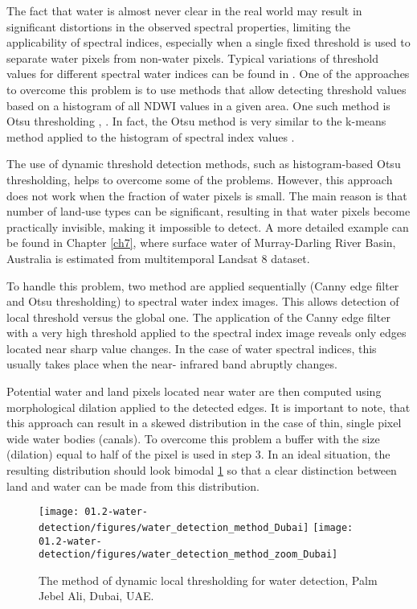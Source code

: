 The fact that water is almost never clear in the real world may result in significant distortions in the observed spectral properties, limiting the applicability of spectral indices, especially when a single fixed threshold is used to separate water pixels from non-water pixels. Typical variations of threshold values for different spectral water indices can be found in \citep{Ji2009}. One of the approaches to overcome this problem is to use methods that allow detecting threshold values based on a histogram of all NDWI values in a given area. One such method is Otsu thresholding \citep{Li2013}, \citep{Yang2014}. In fact, the Otsu method is very similar to the k-means method applied to the histogram of spectral index values \citep{Liu2009}.

The use of dynamic threshold detection methods, such as histogram-based Otsu thresholding, helps to overcome some of the problems. However, this approach does not work when the fraction of water pixels is small. The main reason is that number of land-use types can be significant, resulting in that water pixels become practically invisible, making it impossible to detect. A more detailed example can be found in Chapter \ref{ch7}, where surface water of Murray-Darling River Basin, Australia is estimated from multitemporal Landsat 8 dataset.

To handle this problem, two method are applied sequentially (Canny edge filter and Otsu thresholding) to spectral water index images. This allows detection of local threshold versus the global one. The application of the Canny edge filter with a very high threshold applied to the spectral index image reveals only edges located near sharp value changes. In the case of water spectral indices, this usually takes place when the near- infrared band abruptly changes.

Potential water and land pixels located near water are then computed using morphological dilation applied to the detected edges. It is important to note, that this approach can result in a skewed distribution in the case of thin, single pixel wide water bodies (canals). To overcome this problem a buffer with the size (dilation) equal to half of the pixel is used in step 3. In an ideal situation, the resulting distribution should look bimodal \ref{fig:water_detection_method} so that a clear distinction between land and water can be made from this distribution.

\begin{figure}
	\centering
	\texttt{[image: 01.2-water-detection/figures/water\_detection\_method\_Dubai]}
	\texttt{[image: 01.2-water-detection/figures/water\_detection\_method\_zoom\_Dubai]}
	\caption{The method of dynamic local thresholding for water detection, Palm Jebel Ali, Dubai, UAE. }
	\label{fig:water_detection_method}
\end{figure}

